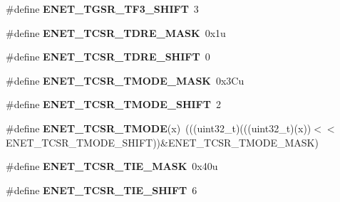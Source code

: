 \begin{DoxyCompactItemize}
\item 
\#define {\bfseries E\+N\+E\+T\+\_\+\+T\+G\+S\+R\+\_\+\+T\+F3\+\_\+\+S\+H\+I\+FT}~3\hypertarget{group__ENET__Register__Masks_gaf027fca605976ae3ebfc79ba1ba3f0e4}{}\label{group__ENET__Register__Masks_gaf027fca605976ae3ebfc79ba1ba3f0e4}

\item 
\#define {\bfseries E\+N\+E\+T\+\_\+\+T\+C\+S\+R\+\_\+\+T\+D\+R\+E\+\_\+\+M\+A\+SK}~0x1u\hypertarget{group__ENET__Register__Masks_ga37a12f7e1bfb1e1c0a09b6664d09cde8}{}\label{group__ENET__Register__Masks_ga37a12f7e1bfb1e1c0a09b6664d09cde8}

\item 
\#define {\bfseries E\+N\+E\+T\+\_\+\+T\+C\+S\+R\+\_\+\+T\+D\+R\+E\+\_\+\+S\+H\+I\+FT}~0\hypertarget{group__ENET__Register__Masks_ga82b3d1ee96813bba32fb72ae120d7047}{}\label{group__ENET__Register__Masks_ga82b3d1ee96813bba32fb72ae120d7047}

\item 
\#define {\bfseries E\+N\+E\+T\+\_\+\+T\+C\+S\+R\+\_\+\+T\+M\+O\+D\+E\+\_\+\+M\+A\+SK}~0x3\+Cu\hypertarget{group__ENET__Register__Masks_gacd9d9ec96fb7eb23ef9b22525d632424}{}\label{group__ENET__Register__Masks_gacd9d9ec96fb7eb23ef9b22525d632424}

\item 
\#define {\bfseries E\+N\+E\+T\+\_\+\+T\+C\+S\+R\+\_\+\+T\+M\+O\+D\+E\+\_\+\+S\+H\+I\+FT}~2\hypertarget{group__ENET__Register__Masks_gaf43c487f5c76a9af36293da5b3360865}{}\label{group__ENET__Register__Masks_gaf43c487f5c76a9af36293da5b3360865}

\item 
\#define {\bfseries E\+N\+E\+T\+\_\+\+T\+C\+S\+R\+\_\+\+T\+M\+O\+DE}(x)~(((uint32\+\_\+t)(((uint32\+\_\+t)(x))$<$$<$E\+N\+E\+T\+\_\+\+T\+C\+S\+R\+\_\+\+T\+M\+O\+D\+E\+\_\+\+S\+H\+I\+FT))\&E\+N\+E\+T\+\_\+\+T\+C\+S\+R\+\_\+\+T\+M\+O\+D\+E\+\_\+\+M\+A\+SK)\hypertarget{group__ENET__Register__Masks_ga3d37a6772d89ad0e435b06bae3ec125d}{}\label{group__ENET__Register__Masks_ga3d37a6772d89ad0e435b06bae3ec125d}

\item 
\#define {\bfseries E\+N\+E\+T\+\_\+\+T\+C\+S\+R\+\_\+\+T\+I\+E\+\_\+\+M\+A\+SK}~0x40u\hypertarget{group__ENET__Register__Masks_ga1a36ae4a9731e381fa9159387670143f}{}\label{group__ENET__Register__Masks_ga1a36ae4a9731e381fa9159387670143f}

\item 
\#define {\bfseries E\+N\+E\+T\+\_\+\+T\+C\+S\+R\+\_\+\+T\+I\+E\+\_\+\+S\+H\+I\+FT}~6\hypertarget{group__ENET__Register__Masks_ga35fcee5f4e7c9e5b69af4039ee4fa537}{}\label{group__ENET__Register__Masks_ga35fcee5f4e7c9e5b69af4039ee4fa537}


\end{DoxyCompactItemize}

